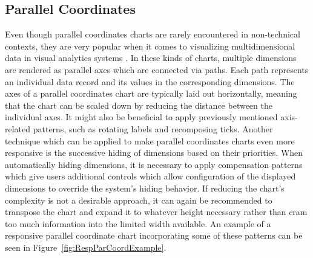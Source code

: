 \subsection{Parallel Coordinates}


Even though parallel coordinates charts are rarely encountered in
non-technical contexts, they are very popular when it comes to
visualizing multidimensional data in visual analytics systems
\parencite{HighD}.  In these kinds of charts, multiple dimensions are
rendered as parallel axes which are connected via paths.  Each path
represents an individual data record and its values in the
corresponding dimensions.  The axes of a parallel coordinates chart
are typically laid out horizontally, meaning that the chart can be
scaled down by reducing the distance between the individual axes.  It
might also be beneficial to apply previously mentioned axis-related
patterns, such as rotating labels and recomposing ticks.  Another
technique which can be applied to make parallel coordinates charts
even more responsive is the successive hiding of dimensions based on
their priorities.  When automatically hiding dimensions, it is
necessary to apply compensation patterns which give users additional
controls which allow configuration of the displayed dimensions to
override the system's hiding behavior.  If reducing the chart's
complexity is not a desirable approach, it can again be recommended to
transpose the chart and expand it to whatever height necessary rather
than cram too much information into the limited width available.  An
example of a responsive parallel coordinate chart incorporating some
of these patterns can be seen in Figure~\ref{fig:RespParCoordExample}.


